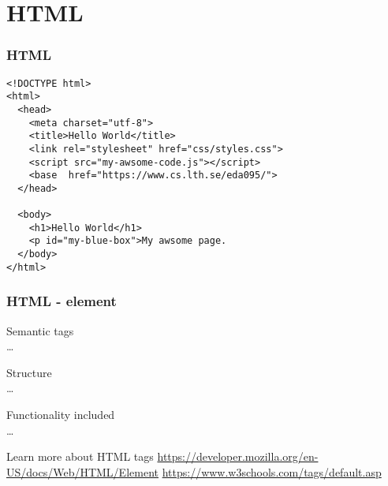 \section{HTML}

\begin{frame}[fragile]
\frametitle{HTML}
\begin{lstlisting}[style=htmlcssjs]
<!DOCTYPE html>
<html>
  <head>
    <meta charset="utf-8">
    <title>Hello World</title>
    <link rel="stylesheet" href="css/styles.css">
    <script src="my-awsome-code.js"></script>
    <base  href="https://www.cs.lth.se/eda095/">
  </head>

  <body>
    <h1>Hello World</h1>
    <p id="my-blue-box">My awsome page.
  </body>
</html>
\end{lstlisting}
\end{frame}

\begin{frame}[fragile]
\frametitle{HTML - element}

Semantic tags\\
\ldots
\bigskip

Structure\\
\ldots
\bigskip

Functionality included\\
\ldots
\bigskip
\color{structure}

Learn more about HTML tags \url{https://developer.mozilla.org/en-US/docs/Web/HTML/Element}
\url{https://www.w3schools.com/tags/default.asp}
\end{frame}

